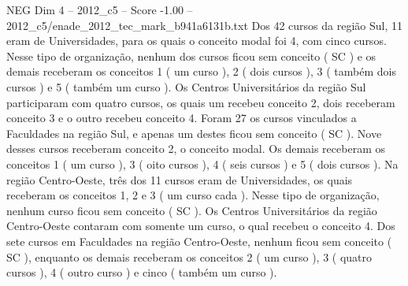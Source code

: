 \begin{textsample}{NEG Dim 4 – 2012\_c5 – Score -1.00 – 2012\_c5/enade\_2012\_tec\_mark\_b941a6131b.txt}
Dos 42 cursos da região Sul, 11 eram de Universidades, para os quais o conceito modal foi 4, com cinco cursos.
Nesse tipo de organização, nenhum dos cursos ficou sem conceito ( SC ) e os demais receberam os conceitos 1 ( um curso ), 2 ( dois cursos ), 3 ( também dois cursos ) e 5 ( também um curso ).
Os Centros Universitários da região Sul participaram com quatro cursos, os quais um recebeu conceito 2, dois receberam conceito 3 e o outro recebeu conceito 4.
Foram 27 os cursos vinculados a Faculdades na região Sul, e apenas um destes ficou sem conceito ( SC ).
Nove desses cursos receberam conceito 2, o conceito modal.
Os demais receberam os conceitos 1 ( um curso ), 3 ( oito cursos ), 4 ( seis cursos ) e 5 ( dois cursos ).
Na região Centro-Oeste, três dos 11 cursos eram de Universidades, os quais receberam os conceitos 1, 2 e 3 ( um curso cada ).
Nesse tipo de organização, nenhum curso ficou sem conceito ( SC ).
Os Centros Universitários da região Centro-Oeste contaram com somente um curso, o qual recebeu o conceito 4.
Dos sete cursos em Faculdades na região Centro-Oeste, nenhum ficou sem conceito ( SC ), enquanto os demais receberam os conceitos 2 ( um curso ), 3 ( quatro cursos ), 4 ( outro curso ) e cinco ( também um curso ).

\end{textsample}
